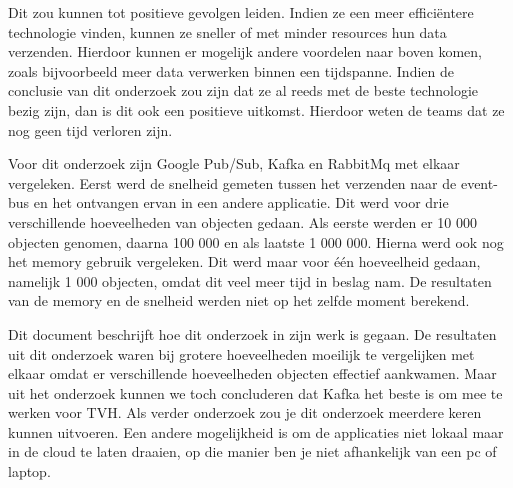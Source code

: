 Dit zou kunnen tot positieve gevolgen leiden. Indien ze een meer efficiëntere technologie vinden, kunnen ze sneller of met minder resources hun data verzenden. Hierdoor kunnen er mogelijk andere voordelen naar boven komen, zoals bijvoorbeeld meer data verwerken binnen een tijdspanne. Indien de conclusie van dit onderzoek zou zijn dat ze al reeds met de beste technologie bezig zijn, dan is dit ook een positieve uitkomst. Hierdoor weten de teams dat ze nog geen tijd verloren zijn.

Voor dit onderzoek zijn Google Pub/Sub, Kafka en RabbitMq met elkaar vergeleken. Eerst werd de snelheid gemeten tussen het verzenden naar de event-bus en het ontvangen ervan in een andere applicatie. Dit werd voor drie verschillende hoeveelheden van objecten gedaan. Als eerste werden er 10 000 objecten genomen, daarna 100 000 en als laatste 1 000 000. Hierna werd ook nog het memory gebruik vergeleken. Dit werd maar voor één hoeveelheid gedaan, namelijk 1 000 objecten, omdat dit veel meer tijd in beslag nam. De resultaten van de memory en de snelheid werden niet op het zelfde moment berekend. 

Dit document beschrijft hoe dit onderzoek in zijn werk is gegaan. De resultaten uit dit onderzoek waren bij grotere hoeveelheden moeilijk te vergelijken met elkaar omdat er verschillende hoeveelheden objecten effectief aankwamen. Maar uit het onderzoek kunnen we toch concluderen dat Kafka het beste is om mee te werken voor TVH. Als verder onderzoek zou je dit onderzoek meerdere keren kunnen uitvoeren. Een andere mogelijkheid is om de applicaties niet lokaal maar in de cloud te laten draaien, op die manier ben je niet afhankelijk van een pc of laptop.
